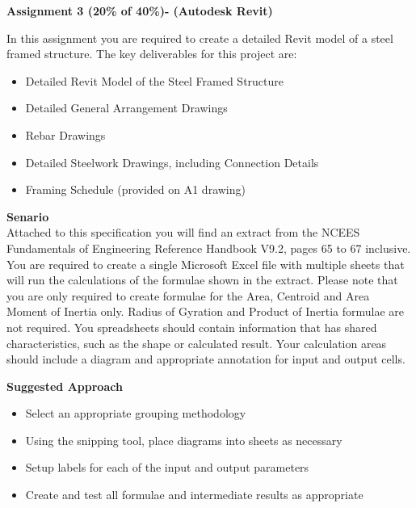 
	
\begin{flushleft}
\Large\textbf{Assignment 3 (20\% of 40\%)- (Autodesk Revit) }\\
\end{flushleft}

In this assignment you are required to create a detailed Revit model of a steel framed structure.  The key deliverables for this project are:

\begin{itemize}
	\item Detailed Revit Model of the Steel Framed Structure
	\item Detailed General Arrangement Drawings
	\item Rebar Drawings
	\item Detailed Steelwork Drawings, including Connection Details
	\item Framing Schedule (provided on A1 drawing) 
\end{itemize}

\textbf{Senario}\\


Attached to this specification you will find an extract from the NCEES Fundamentals of Engineering Reference Handbook V9.2, pages 65 to 67 inclusive.  You are required to create a single Microsoft Excel file with multiple sheets that will run the calculations of the formulae shown in the extract.  Please note that you are only required to create formulae for the Area, Centroid and Area Moment of Inertia only.  Radius of Gyration and Product of Inertia formulae are not required.  You spreadsheets should contain information that has shared characteristics, such as the shape or calculated result.  Your calculation areas should include a diagram and appropriate annotation for input and output cells.


\vspace{.5cm}

\textbf{Suggested Approach}

\begin{itemize}
	\item Select an appropriate grouping methodology
	\item Using the snipping tool, place diagrams into sheets as necessary
	\item Setup labels for each of the input and output parameters
	\item Create and test all formulae and intermediate results as appropriate
\end{itemize}

